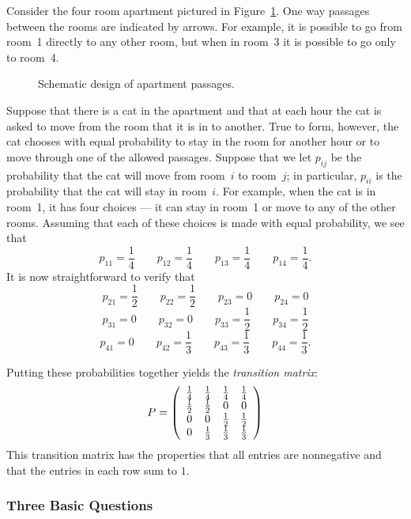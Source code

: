 Consider the four room apartment pictured in Figure~\ref{F:apart}.  One way
passages between the rooms are indicated by arrows.  For example, it is
possible to go from room~1 directly to any other room, but when in room~3
it is possible to go only to room~4.

\begin{figure}[htb]
        \centerline{%
        }
        \caption{Schematic design of apartment passages.}
        \label{F:apart}
\end{figure}

Suppose that there is a cat in the apartment and that at each hour the cat is
asked to move from the room that it is in to another.  True to form, however,
the cat chooses with equal probability to stay in the room for another hour
or to move through one of the allowed passages.  Suppose that we let $p_{ij}$
be the probability that the cat will move from room~$i$ to room~$j$; in
particular, $p_{ii}$ is the probability that the cat will stay in room~$i$.
For example, when the cat is in room~1, it has four choices  --- it can
stay in room~1 or move to any of the other rooms.  Assuming that each of
these choices is made with equal probability, we see that
\[
p_{11} = \frac{1}{4} \qquad p_{12} = \frac{1}{4} \qquad p_{13} =
\frac{1}{4} \qquad p_{14} = \frac{1}{4}.
\]
It is now straightforward to verify that
\[
p_{21} = \frac{1}{2} \qquad p_{22} = \frac{1}{2} \qquad p_{23} = 0
\qquad p_{24} = 0
\]
\[
p_{31} = 0 \qquad p_{32} = 0 \qquad p_{33} =
\frac{1}{2} \qquad p_{34} = \frac{1}{2}
\]
\[
p_{41} = 0 \qquad p_{42} = \frac{1}{3} \qquad p_{43} =
\frac{1}{3} \qquad p_{44} = \frac{1}{3}.
\]

Putting these probabilities together yields the
{\em transition matrix}:
\begin{equation*} \label{E:Pexamp}
P = \left(\begin{array}{cccc}
\frac{1}{4} & \frac{1}{4} & \frac{1}{4} & \frac{1}{4} \\
\mbox{$\frac{1}{2}$} & \mbox{$\frac{1}{2}$} & 0 & 0 \\
 0 & 0 & \mbox{$\frac{1}{2}$} & \mbox{$\frac{1}{2}$}\\
0 & \frac{1}{3} & \frac{1}{3} & \frac{1}{3}
\end{array}\right)
\end{equation*}
This transition matrix has the properties that all entries are nonnegative
and that the entries in each row sum to $1$.

\subsubsection*{Three Basic Questions}


